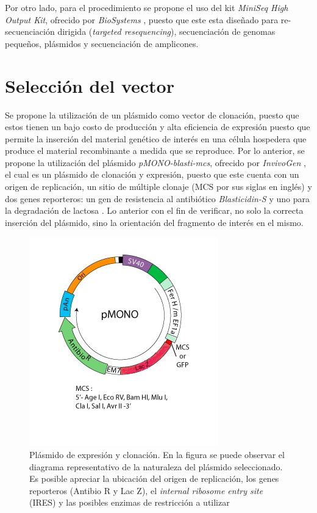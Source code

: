 \documentclass[12pt]{article}
\begin{document}
			Por otro lado, para el procedimiento se propone el uso del kit \textit{MiniSeq High Output Kit}, ofrecido por \textit{BioSystems} \cite{MiniSeq}, puesto que este esta diseñado para re-secuenciación dirigida (\textit{targeted resequencing}), secuenciación de genomas pequeños, plásmidos y secuenciación de amplicones.
		
	\section{Selecci\'on del vector}
		Se propone la utilización de un plásmido como vector de clonación, puesto que estos tienen un bajo costo de producción y alta eficiencia de expresión puesto que permite la inserción del material genético de interés en una célula hospedera que produce el material recombinante a medida que se reproduce. Por lo anterior, se propone la utilización del plásmido \textit{pMONO-blasti-mcs}, ofrecido por \textit{InvivoGen} \cite{pMONO-blasti}, el cual es un pl\'asmido de clonación y expresión, puesto que este cuenta con un origen de replicación, un sitio de múltiple clonaje (MCS por sus siglas en inglés) y dos genes reporteros: un gen de resistencia al antibiótico \textit{Blasticidin-S} y uno para la degradación de lactosa \cite{izumi1991blasticidin}. Lo anterior con el fin de verificar, no  solo la correcta inserción del plásmido, sino la orientación del fragmento de interés en el mismo.
		
		\begin{figure}[h]
			\centering
			\includegraphics[width=0.5\linewidth]{plasmido}
			\caption{Pl\'asmido de expresión y clonación. En la figura se puede observar el diagrama representativo de la naturaleza del plásmido seleccionado. Es posible apreciar la ubicación del origen de replicación, los genes reporteros (Antibio R y Lac Z), el \textit{internal ribosome entry site} (IRES) y las posibles enzimas de restricción a utilizar}
			\label{fig:2}
		\end{figure}
	
\end{document}
